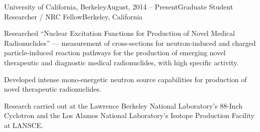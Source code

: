 \begin{rSubsection}{University of California, Berkeley}{August, 2014 -- Present}{Graduate Student Researcher / NRC Fellow}{Berkeley, California}
\item  
Researched \enquote{Nuclear Excitation Functions for Production of Novel Medical Radionuclides} ---  
measurement of cross-sections for neutron-induced and charged particle-induced reaction pathways for the production of emerging novel therapeutic and diagnostic medical radionuclides, with high specific activity.  
\item  Developed intense mono-energetic neutron source capabilities for production of novel therapeutic radionuclides.
\item  Research carried out at 
the Lawrence Berkeley National Laboratory's 88-Inch Cyclotron and the Los Alamos National Laboratory's  Isotope Production Facility at LANSCE.
\end{rSubsection}

